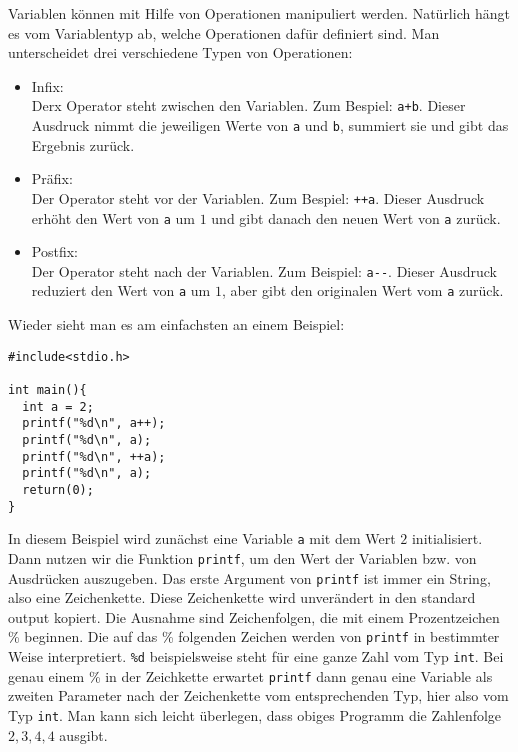 Variablen können mit Hilfe von Operationen manipuliert werden.
Natürlich hängt es vom Variablentyp ab, welche Operationen dafür definiert sind.
Man unterscheidet drei verschiedene Typen von Operationen:
\begin{itemize}
\item Infix:\\
  Derx Operator steht zwischen den Variablen. Zum Bespiel: \verb|a+b|. 
  Dieser Ausdruck nimmt die jeweiligen Werte von \verb|a| und \verb|b|, summiert sie und gibt das Ergebnis zurück.
\item Präfix:\\
  Der Operator steht vor der Variablen. Zum Bespiel: \verb|++a|. 
  Dieser Ausdruck erhöht den Wert von \verb|a| um $1$ und gibt danach den neuen Wert von \verb|a| zurück.
\item Postfix:\\
  Der Operator steht nach der Variablen. Zum Beispiel: \verb|a--|. 
  Dieser Ausdruck reduziert den Wert von \verb|a| um $1$, aber gibt den originalen Wert vom \verb|a| zurück.
\end{itemize}
Wieder sieht man es am einfachsten an einem Beispiel:
\begin{lstlisting}
#include<stdio.h>

int main(){
  int a = 2;
  printf("%d\n", a++);
  printf("%d\n", a);
  printf("%d\n", ++a);
  printf("%d\n", a);
  return(0);  
}
\end{lstlisting}
In diesem Beispiel wird zunächst eine Variable \texttt{a} mit dem Wert $2$ initialisiert. 
Dann nutzen wir die Funktion \texttt{printf}, um den Wert der Variablen bzw. von Ausdrücken auszugeben. 
Das erste Argument von \texttt{printf} ist immer ein String, also eine Zeichenkette.
Diese Zeichenkette wird unverändert in den standard output kopiert.
Die Ausnahme sind Zeichenfolgen, die mit einem Prozentzeichen \% beginnen.
Die auf das \% folgenden Zeichen werden von \texttt{printf} in bestimmter Weise interpretiert.
\verb|%d| beispielsweise steht für eine ganze Zahl vom Typ \texttt{int}. 
Bei genau einem \% in der Zeichkette erwartet \texttt{printf} dann genau eine Variable als zweiten Parameter nach der Zeichenkette vom entsprechenden Typ, hier also vom Typ \texttt{int}.
Man kann sich leicht überlegen, dass obiges Programm die Zahlenfolge $2,3,4,4$ ausgibt.

